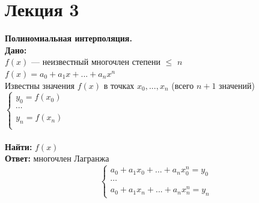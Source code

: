 \documentclass[12pt]{article}
\theoremstyle{definition}
\numberwithin{equation}{section}
\begin{document}
	\section *{Лекция 3}
	\noindent \textbf{Полиномиальная интерполяция.}\\
	\textbf{Дано:} \\$f(x)$ --- неизвестный многочлен степени $\leq$ $n$\\
	$f(x) = a_{0}+a_1x+...+a_nx^n$ \\
	Известны значения $f(x)$ в точках $x_0, ..., x_n$ (всего $n+1$ значений)\\ 
	$
	\left\{  
	\begin{array}{ccl}  
	y_0=f(x_0)\\
	\cdots\\
	y_n=f(x_n)\\  
	\end{array}   
	\right.  
	$
	\\
	\\ \textbf{Найти:} $f(x)$
	\\ \textbf{Ответ:} многочлен Лагранжа \\
	\begin{equation*}
	\begin{cases}
	a_0+a_1x_0+...+a_nx_0^n = y_0\\
	\cdots\\
	a_0+a_1x_n+...+a_nx_n^n = y_n
	\end{cases}
	\end{equation*}
	
\end{document}
